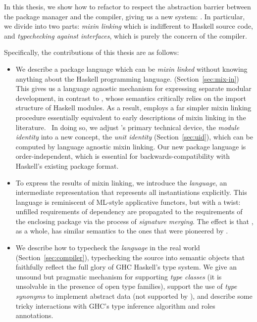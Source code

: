 In this thesis, we show how to refactor
\OldBackpack{} to respect the abstraction barrier between the package
manager and the compiler, giving us a new system: \Backpack{}.  In
particular, we divide \Backpack{} into two parts: \emph{mixin linking}
which is indifferent to Haskell source code, and \emph{typechecking against
interfaces}, which is purely the concern of the compiler.

Specifically, the contributions of this thesis are as follows:
\begin{itemize}

    \item We describe a package language which can be \emph{mixin
    linked} without knowing anything about the Haskell programming
    language. (Section~\ref{sec:mix-in})  This gives us a language agnostic mechanism for
    expressing separate modular development, in contrast to
    \OldBackpack{}, whose semantics critically relies on the import structure
    of Haskell modules.  As a result, \Backpack{}
    employs a far simpler mixin linking procedure essentially equivalent
    to early descriptions of mixin linking in the literature.~\cite{cardelli:linksets}
    In doing so, we adjust \OldBackpack{}'s primary technical device,
    the \emph{module identity} into a new concept, the \emph{unit identity} (Section~\ref{sec:uid}),
    which can be computed by language agnostic mixin linking.
    Our new package language is order-independent, which is
    essential for backwards-compatibility with Haskell's existing
    package format.

    \item To express the results of mixin linking, we introduce the
    \emph{\unit{} language}, an intermediate representation that
    represents all instantiations explicitly.  This language is reminiscent of
    ML-style applicative functors, but with a twist:
    unfilled requirements of dependency are propagated to the requirements
    of the enclosing package via the process of \emph{signature merging}.
    The effect is that \Backpack{}, as a whole, has similar
    semantics to the ones that were pioneered by \OldBackpack{}.

    \item We describe how to typecheck the \emph{\unit{} language} in the
    real world (Section~\ref{sec:compiler}), typechecking the source into semantic objects that
    faithfully reflect the full glory of GHC Haskell's type system.
    We give an unsound but pragmatic mechanism for supporting \emph{type classes}
    (it is unsolvable in the presence of open type families), support
    the use of \emph{type synonyms} to implement abstract data
    (not supported by \OldBackpack{}), and describe
    some tricky interactions with GHC's type inference algorithm and
    roles annotations.


\end{itemize}
